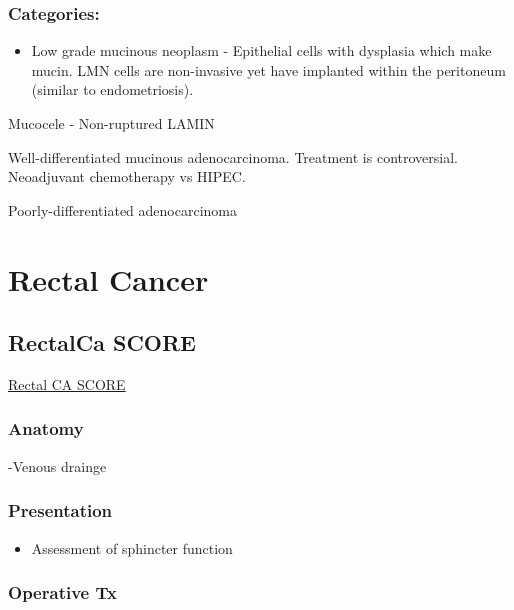 \documentclass[
]{book}
\providecommand{\tightlist}{%
  \setlength{\itemsep}{0pt}\setlength{\parskip}{0pt}}
\begin{document}
\hypertarget{categories}{%
\section{Categories:}\label{categories}}

\begin{itemize}
\tightlist
\item
  Low grade mucinous neoplasm - Epithelial cells with dysplasia which make mucin. LMN cells are non-invasive yet have implanted within the peritoneum (similar to endometriosis).
\end{itemize}

Mucocele - Non-ruptured LAMIN

Well-differentiated mucinous adenocarcinoma. Treatment is controversial. Neoadjuvant chemotherapy vs HIPEC.

Poorly-differentiated adenocarcinoma

\hypertarget{part-rectal-cancer}{%
\part*{Rectal Cancer}\label{part-rectal-cancer}}

\hypertarget{rectalca-score}{%
\chapter{RectalCa SCORE}\label{rectalca-score}}

\href{https://www.surgicalcore.org/modulecontent.aspx?id=130244}{Rectal CA SCORE}

\hypertarget{anatomy}{%
\section{Anatomy}\label{anatomy}}

-Venous drainge

\hypertarget{presentation}{%
\section{Presentation}\label{presentation}}

\begin{itemize}
\tightlist
\item
  Assessment of sphincter function
\end{itemize}

\hypertarget{operative-tx}{%
\section{Operative Tx}\label{operative-tx}}
\end{document}
